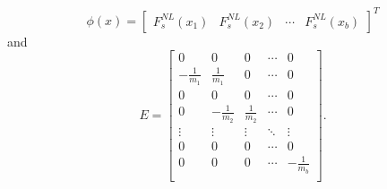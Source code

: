 \begin{equation}
    \phi(x) =
    \begin{bmatrix}
        F_s^{NL}(x_1) & F_s^{NL}(x_2) & \cdots & F_s^{NL}(x_b)
    \end{bmatrix}^T
\end{equation}
and
\begin{equation}\label{eqn:msd-E}
    E =
    \begin{bmatrix}
        0 & 0 & 0 & \cdots & 0 \\
        -\frac{1}{m_1} & \frac{1}{m_1} & 0 & \cdots & 0 \\
        0 & 0 & 0 & \cdots & 0 \\
        0 & -\frac{1}{m_2} & \frac{1}{m_2} & \cdots & 0 \\
        \vdots & \vdots & \vdots & \ddots & \vdots \\
        0 & 0 & 0 & \cdots & 0 \\
        0 & 0 & 0 & \cdots & -\frac{1}{m_b} \\
    \end{bmatrix}.
\end{equation}

